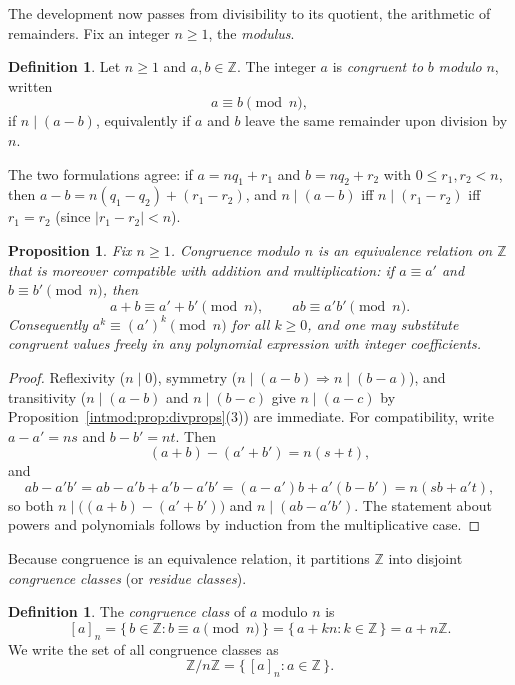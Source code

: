 \documentclass[11pt,a4paper]{article}
\newtheorem{proposition}[theorem]{Proposition}
\theoremstyle{definition}
\newtheorem{definition}[theorem]{Definition}
\theoremstyle{remark}
\newcommand{\Z}{\ensuremath{\mathbb{Z}}}
\begin{document}
The development now passes from divisibility to its quotient, the arithmetic of remainders. Fix an integer \(n\ge 1\), the \emph{modulus}.

\begin{definition}\label{intmod:def:congruent}
Let \(n\ge 1\) and \(a,b\in\Z\). The integer \(a\) is \emph{congruent to} \(b\) \emph{modulo} \(n\), written
\[
a\equiv b \pmod n,
\]
if \(n\mid (a-b)\), equivalently if \(a\) and \(b\) leave the same remainder upon division by \(n\).
\end{definition}

The two formulations agree: if \(a=nq_1+r_1\) and \(b=nq_2+r_2\) with \(0\le r_1,r_2<n\), then \(a-b=n(q_1-q_2)+(r_1-r_2)\), and \(n\mid(a-b)\) iff \(n\mid(r_1-r_2)\) iff \(r_1=r_2\) (since \(|r_1-r_2|<n\)).

\begin{proposition}\label{intmod:prop:congequiv}
Fix \(n\ge 1\). Congruence modulo \(n\) is an equivalence relation on \(\Z\) that is moreover compatible with addition and multiplication: if \(a\equiv a'\) and \(b\equiv b'\pmod n\), then
\[
a+b\equiv a'+b' \pmod n, \qquad ab\equiv a'b' \pmod n.
\]
Consequently \(a^k\equiv (a')^k\pmod n\) for all \(k\ge 0\), and one may substitute congruent values freely in any polynomial expression with integer coefficients.
\end{proposition}

\begin{proof}
Reflexivity (\(n\mid 0\)), symmetry (\(n\mid(a-b)\Rightarrow n\mid(b-a)\)), and transitivity (\(n\mid(a-b)\) and \(n\mid(b-c)\) give \(n\mid(a-c)\) by Proposition~\ref{intmod:prop:divprops}(3)) are immediate. For compatibility, write \(a-a'=n s\) and \(b-b'=n t\). Then
\[
(a+b)-(a'+b')=n(s+t),
\]
and
\[
ab-a'b' = ab - a'b + a'b - a'b' = (a-a')b + a'(b-b') = n(sb + a' t),
\]
so both \(n\mid\bigl((a+b)-(a'+b')\bigr)\) and \(n\mid(ab-a'b')\). The statement about powers and polynomials follows by induction from the multiplicative case.
\end{proof}

Because congruence is an equivalence relation, it partitions \(\Z\) into disjoint \emph{congruence classes} (or \emph{residue classes}).

\begin{definition}\label{intmod:def:residueclass}
The \emph{congruence class} of \(a\) modulo \(n\) is
\[
[a]_n = \{\, b\in\Z : b\equiv a \pmod n \,\} = \{\, a+kn : k\in\Z \,\} = a+n\Z.
\]
We write the set of all congruence classes as
\[
\Z/n\Z = \{\, [a]_n : a\in\Z \,\}.
\]
\end{definition}
\end{document}
